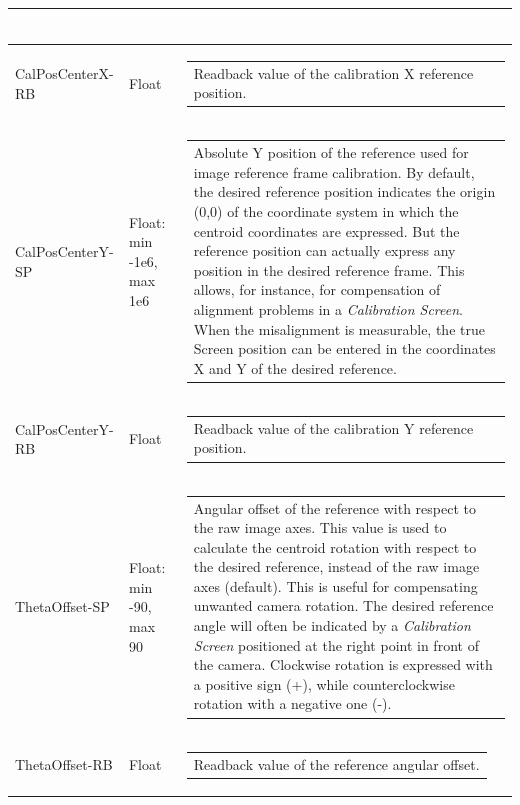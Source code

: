 \documentclass[openany]{article}
\begin{document}
\begin{longtable}{| m{3.0cm} m{4.5cm}  m{7.0cm} |}
\begin{tabular}{@{}m{6cm}@{}}
            \end{tabular} \\ \hline
        CalPosCenterX-RB & Float & \begin{tabular}{@{}m{6cm}@{}}
                Readback value of the calibration X reference position.
            \end{tabular} \hypertarget{pv:cal-pos-center-y}{}\\ \hline
        CalPosCenterY-SP & Float: min -1e6, max 1e6 & \begin{tabular}{@{}m{6cm}@{}}
                Absolute Y position of the reference used for image reference frame calibration. By default, the desired reference position indicates the origin (0,0) of the coordinate system in which the centroid coordinates are expressed. But the reference position can actually express any position in the desired reference frame. This allows, for instance, for compensation of alignment problems in a \emph{Calibration Screen}. When the misalignment is measurable, the true Screen position can be entered in the coordinates X and Y of the desired reference.
            \end{tabular} \\ \hline
        CalPosCenterY-RB & Float & \begin{tabular}{@{}m{6cm}@{}}
                Readback value of the calibration Y reference position.
            \end{tabular} \hypertarget{pv:theta-offset}{}\\ \hline
        ThetaOffset-SP & Float: min -90, max 90 & \begin{tabular}{@{}m{6cm}@{}}
                Angular offset of the reference with respect to the raw image axes. This value is used to calculate the centroid rotation with respect to the desired reference, instead of the raw image axes (default). This is useful for compensating unwanted camera rotation. The desired reference angle will often be indicated by a \emph{Calibration Screen} positioned at the right point in front of the camera. Clockwise rotation is expressed with a positive sign (+), while counterclockwise rotation with a negative one (-).
            \end{tabular} \\ \hline
        ThetaOffset-RB & Float & \begin{tabular}{@{}m{6cm}@{}}
                Readback value of the reference angular offset.

\end{tabular}
\end{longtable}
\end{document}
